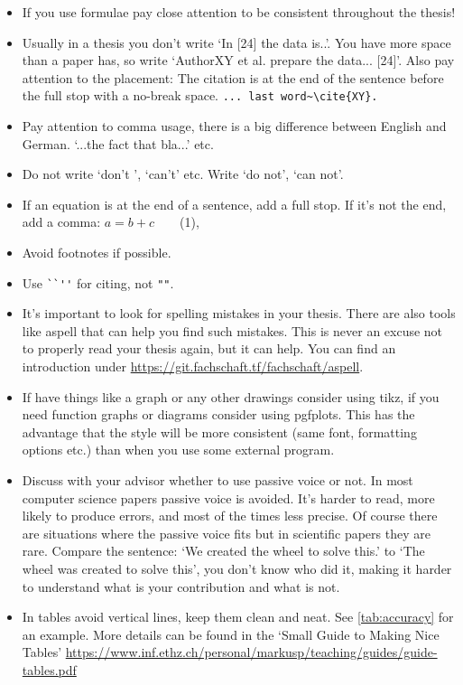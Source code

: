     \begin{itemize}

        \item If you use formulae pay close attention to be consistent throughout the thesis!

        \item Usually  in a thesis you don't write `In [24] the data is..'. You have more space than a paper has, so write `AuthorXY et al. prepare the data... [24]'. Also pay attention to the placement: The citation is at the end of the sentence before the full stop with a no-break space. \verb|... last word~\cite{XY}.|

        \item Pay attention to comma usage, there is a big difference between English and German. `...the fact that bla...' etc.

        \item Do not write `don't ', `can't' etc. Write `do not', `can not'.

        \item If an equation is at the end of a sentence, add a full stop. If it's not the end, add a comma: {$a= b + c$~~~~(1),}

        \item Avoid footnotes if possible.

        \item Use \verb|``''| for citing, not \verb|""|.

        \item It's important to look for spelling mistakes in your thesis. There are also tools like aspell that can help you find such mistakes.
        This is never an excuse not to properly read your thesis again, but it can help.
        You can find an introduction under \url{https://git.fachschaft.tf/fachschaft/aspell}.

        \item If have things like a graph or any other drawings consider using tikz, if you need function graphs or diagrams consider using pgfplots.
        This has the advantage that the style will be more consistent (same font, formatting options etc.) than when you use some external program.

        \item Discuss with your advisor whether to use passive voice or not. In most computer science papers passive voice is avoided. It's harder to read, more likely to produce errors, and most of the times less precise. Of course there are situations where the passive voice fits but in scientific papers they are rare. Compare the sentence: `We created the wheel to solve this.' to `The wheel was created to solve this', you don't know who did it, making it harder to understand what is your contribution and what is not.
        
        \item In tables avoid vertical lines, keep them clean and neat. See \ref{tab:accuracy} for an example. More details can be found in the `Small Guide to Making Nice Tables' \url{https://www.inf.ethz.ch/personal/markusp/teaching/guides/guide-tables.pdf}

    \end{itemize}
